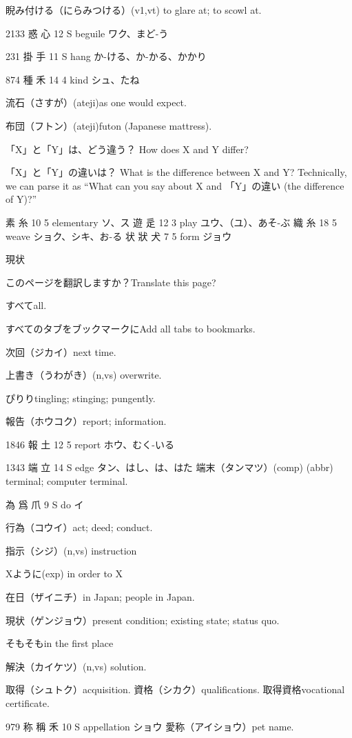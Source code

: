 睨み付ける（にらみつける）(v1,vt) to glare at; to scowl at.

2133	惑		心	12	S		beguile	ワク、まど-う

231	掛		手	11	S		hang	か-ける、か-かる、かかり

874	種		禾	14	4		kind	シュ、たね

流石（さすが）(ateji)as one would expect.

布団（フトン）(ateji)futon (Japanese mattress).

「X」と「Y」は、どう違う？
How does X and Y differ?

「X」と「Y」の違いは？
What is the difference between X and Y?
Technically, we can parse it as
``What can you say about X and 「Y」の違い (the difference of Y)?''

素  糸 10 5  elementary ソ、ス
遊  辵 12 3  play ユウ、（ユ）、あそ-ぶ
織  糸 18 5  weave ショク、シキ、お-る
状 狀 犬 7 5  form ジョウ

現状

このページを翻訳しますか？Translate this page?

すべてall.

すべてのタブをブックマークにAdd all tabs to bookmarks.

次回（ジカイ）next time.

上書き（うわがき）(n,vs) overwrite.

ぴりりtingling; stinging; pungently.

報告（ホウコク）report; information.

1846 報  土 12 5  report ホウ、むく-いる

1343 端  立 14 S  edge タン、はし、は、はた
端末（タンマツ）(comp) (abbr) terminal; computer terminal.

為 爲 爪 9 S  do イ

行為（コウイ）act; deed; conduct.

指示（シジ）(n,vs) instruction

Xように(exp) in order to X

在日（ザイニチ）in Japan; people in Japan.

現状（ゲンジョウ）present condition; existing state; status quo.

そもそもin the first place

解決（カイケツ）(n,vs) solution.

取得（シュトク）acquisition.
資格（シカク）qualifications.
取得資格vocational certificate.

979	称	稱	禾	10	S		appellation	ショウ
愛称（アイショウ）pet name.

